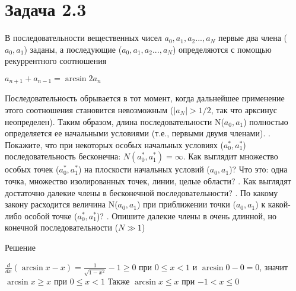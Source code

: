
\usepackage{lineno}

	\section{Задача 2.3}
	В последовательности вещественных чисел $a_0,a_1,a_2 ... ,a_N$ первые два члена
	($a_0,a_1$) заданы, а последующие ($a_0,a_1,a_2 ... ,a_N$) определяются с помощью
	рекуррентного соотношения
	\newline
	\begin{center}
		$a_{n+1}+a_{n-1} = \arcsin 2a_{n}$
	\end{center}
	Последовательность обрывается в тот момент, когда дальнейшее применение этого
	соотношения становится невозможным ($|a_N | > 1/2$, так что арксинус
	неопределен). Таким образом, длина последовательности N($a_0,a_1$) полностью
	определяется ее начальными условиями (т.е., первыми двумя членами).
	. Покажите, что при некоторых особых начальных условиях ($a_{0}^{*},a_{1}^{*}$)
	последовательность бесконечна: $N(a_{0}^{*},a_{1}^{*}) = \infty$. Как выглядит множество
	особых точек {($a_{0}^{*},a_{1}^{*}$)} на плоскости начальных условий ($a_0,a_1$)? Что
	это: одна точка, множество изолированных точек, линии, целые области?
	\newline
	. Как выглядят достаточно далекие члены в бесконечной последовательности?
	\newline
	. По какому закону расходится величина N($a_0,a_1$) при приближении
	точки ($a_0,a_1$) к какой-либо особой точке ($a_{0}^{*},a_{1}^{*}$)?
	\newline
	. Опишите далекие члены в очень длинной, но конечной последовательности
	($N \gg 1$)
	\newline
	\newline
	\begin{center}
		Решение
	\end{center}
	\linenumbers
	$\frac{d}{dx}(\arcsin x - x) = \frac{1}{\sqrt{1-x^2}} - 1 \geq 0$ при $0 \leq x <1$ и $\arcsin 0 - 0 = 0$, значит $ \arcsin x \geq  x $ при $0 \leq x <1$
	\newline
	Также $ \arcsin x \leq  x $ при $-1 < x \leq 0$
